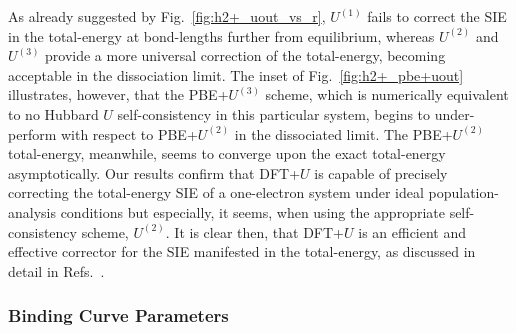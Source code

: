 As already suggested by Fig.~\ref{fig:h2+_uout_vs_r}, 
$U^{(1)}$ fails to correct 
the SIE in the total-energy at bond-lengths further from equilibrium, 
whereas $U^{(2)}$ and $U^{(3)}$  
provide a more universal correction  
of the total-energy, 
becoming  acceptable in the dissociation limit.
%
The inset of Fig.~\ref{fig:h2+_pbe+uout}  
illustrates, however,  that the  
PBE+$U^{(3)}$ scheme, which is numerically equivalent to no 
Hubbard  $U$ self-consistency in this particular system, 
begins to under-perform with respect to  PBE+$U^{(2)}$
in the dissociated limit.
%
The PBE+$U^{(2)}$ total-energy, 
meanwhile,  seems to converge upon 
the exact total-energy asymptotically. 
%
Our results confirm that DFT+$U$ 
is  capable of precisely correcting 
the total-energy SIE of a one-electron system 
under ideal population-analysis conditions but especially, it seems,
when using 
the appropriate self-consistency scheme, $U^{(2)}$.
%
It is clear then, that DFT+$U$ 
is an efficient and effective corrector for the
SIE  manifested in the total-energy, 
as discussed in detail in 
Refs.~\cite{PhysRevLett.97.103001,:/content/aip/journal/jcp/133/11/10.1063/1.3489110,:/content/aip/journal/jcp/145/5/10.1063/1.4959882}. 


\subsubsection{Binding Curve Parameters}
\label{sec:binding_curve_params}
 
